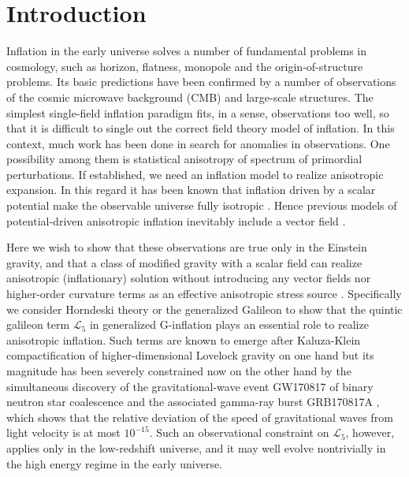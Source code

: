 \documentclass[aps,prd,preprint,superscriptaddress,nofootinbib,tightenlines]{revtex4-1}
\begin{document}
\section{Introduction}
Inflation in the early universe \cite{Starobinsky:1980te,Sato:1980yn,Guth:1980zm,Sato:2015dga}
solves a number of fundamental problems in cosmology, such as horizon, flatness, monopole and the origin-of-structure problems.
Its basic predictions have been confirmed by a number of observations of the cosmic microwave background (CMB)
and large-scale structures.
The simplest single-field inflation paradigm fits, in a sense, observations too well, so that it is difficult to single out the correct field theory model of inflation.
In this context, much work has been done in search for anomalies in observations.
One possibility among them is statistical anisotropy of spectrum of primordial perturbations.
If established, we need an inflation model to realize anisotropic expansion.
In this regard it has been known that inflation driven by a scalar potential make the observable universe fully isotropic \cite{Jensen:1986vy,Turner:1986gj}.
Hence previous models of potential-driven anisotropic inflation inevitably include a vector field \cite{Ford:1989me,Watanabe:2009ct,Do:2017qyd,Adshead:2018emn}.

Here we wish to show that these observations are true only in the Einstein gravity, and that a class of modified gravity with a scalar field can
realize anisotropic (inflationary) solution without introducing any vector fields
nor higher-order curvature terms as an effective anisotropic stress source \cite{Barrow:2005qv,Barrow:2006xb,Barrow:2009gx}.
Specifically we consider Horndeski theory \cite{Horndeski:1974wa} or the generalized Galileon \cite{Deffayet:2011gz} to show that
the quintic galileon term $\mathcal{L}_5$ in generalized G-inflation \cite{Kobayashi:2011nu} plays an essential role to realize anisotropic inflation.
Such terms are known to emerge after Kaluza-Klein compactification of higher-dimensional Lovelock gravity \cite{VanAcoleyen:2011mj} on one hand
but its magnitude has been severely constrained \cite{Baker:2017hug,Creminelli:2017sry,Sakstein:2017xjx,Ezquiaga:2017ekz}
now on the other hand by the simultaneous discovery of the gravitational-wave event GW170817 \cite{TheLIGOScientific:2017qsa}
of binary neutron star coalescence and the associated gamma-ray burst GRB170817A \cite{Goldstein:2017mmi},
which shows that the relative deviation of the speed of gravitational waves from light velocity is at most $10^{-15}$.
Such an observational constraint on $\mathcal{L}_5$, however, applies only in the low-redshift universe,
and it may well evolve nontrivially in the high energy regime in the early universe.
\end{document}
